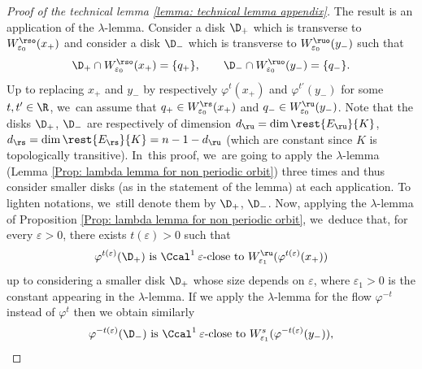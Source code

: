 \begin{appendix}
\begin{proof}[Proof of the technical lemma \ref{lemma: technical lemma appendix}]
The result is an application of the $\lambda$-lemma. Consider a disk $\D_{+}$ which is transverse to $W_{\varepsilon_0}^{\rso} (x_+)$ and consider a disk $\D_{-}$ which is transverse to $W_{\varepsilon_0}^{\ruo} (y_-)$ such that
\[
\D_{+} \cap W_{\varepsilon_0}^{\rso} (x_+) = \{q_+ \}, \qquad \D_{-} \cap W_{\varepsilon_0}^{\ruo} (y_-) = \{q_- \}.
\]
Up to replacing $x_+$ and $y_-$ by respectively $\varphi^t (x_+)$ and $\varphi^{t'}(y_-)$ for some $t, t' \in \R$, we~can assume that $q_+ \in W_{\varepsilon_0}^\rs (x_+)$ and $q_- \in W_{\varepsilon_0}^\ru (y_-)$.
Note that the disks $\D_{+}$, $\D_-$ are respectively of dimension $d_{\ru} = \dim \rest{E_{\ru}}{K}$, $d_{\rs} = \dim \rest{E_{\rs}}{K} = n - 1 - d_{\ru}$ (which are constant since $K$ is topologically transitive). In~this proof, we~are going to apply the $\lambda$-lemma (Lemma \ref{Prop: lambda lemma for non periodic orbit}) three times and thus consider smaller disks (as in the statement of the lemma) at each application. To lighten notations, we~still denote them by $\D_{+}$, $\D_-$. Now, applying the $\lambda$-lemma of Proposition \ref{Prop: lambda lemma for non periodic orbit}, we~deduce that, for every $\varepsilon > 0$, there exists $t (\varepsilon) > 0$ such that
\[
\varphi^{t (\varepsilon)} (\D_{+}) \text{ is } \Ccal^1 \: \varepsilon\text{-close to } W_{\varepsilon_1}^{\ru} (\varphi^{ t (\varepsilon)} (x_+))
\]
up to considering a smaller disk $\D_+$ whose size depends on $\varepsilon$, where $\varepsilon_1 > 0$ is the constant appearing in the $\lambda$-lemma.
If we apply the $\lambda$-lemma for the flow $\varphi^{-t}$ instead of $\varphi^t$ then we obtain similarly
\begin{equation}\label{eq: proof technical lemma - reverse lambda lemma}
\varphi^{-t (\varepsilon)} (\D_{-}) \text{ is } \Ccal^1 \: \varepsilon\text{-close to } W_{\varepsilon_1}^{s} (\varphi^{ - t (\varepsilon)} (y_-)),
\end{equation}

\end{proof}
\end{appendix}

